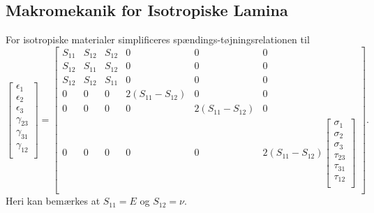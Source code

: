 \subsection{Makromekanik for Isotropiske Lamina}
For isotropiske materialer simplificeres spændings-tøjningsrelationen til
\begin{equation*}
  \begin{bmatrix}
    \epsilon_1\\
  \epsilon_2\\
  \epsilon_3\\
  \gamma_{23}\\
  \gamma_{31}\\
  \gamma_{12}\\
  \end{bmatrix} = \begin{bmatrix}
    S_{11} & S_{12} & S_{12} & 0 & 0 & 0\\
  S_{12} & S_{11} & S_{12} & 0 & 0 & 0\\
  S_{12} & S_{12} & S_{11} & 0 & 0 & 0\\
  0 & 0 & 0 & 2 \left( S_{11} - S_{12} \right) & 0 & 0\\
  0 & 0 & 0 & 0 & 2 \left( S_{11} - S_{12} \right) & 0\\
  0 & 0 & 0 & 0 & 0 & 2 \left( S_{11} - S_{12} \right) \begin{bmatrix}
    \sigma_1\\
  \sigma_2\\
  \sigma_3\\
  \tau_{23}\\
  \tau_{31}\\
  \tau_{12}\\
  \end{bmatrix}\\
  \end{bmatrix}
.\end{equation*}
Heri kan bemærkes at $S_{11} = E$ og $S_{12} = \nu$.

